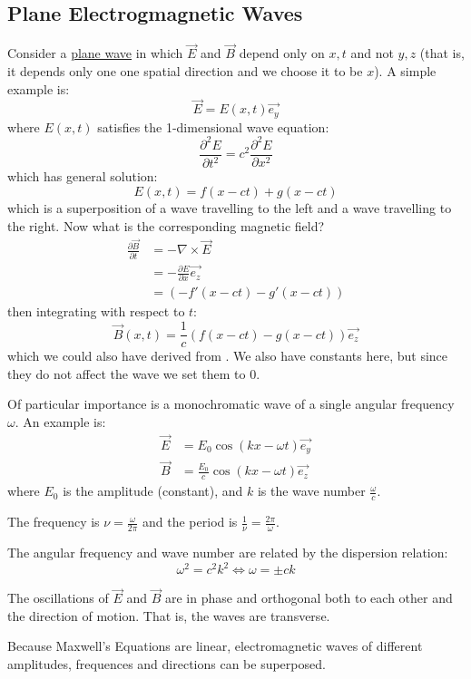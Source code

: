 \documentclass[../Main.tex]{subfiles}
\begin{document}
\subsection{Plane Electrogmagnetic Waves}
Consider a \underline{plane wave} in which $\vec{E}$ and $\vec{B}$ depend only on $x, t$ and not $y, z$ (that is, it depends only one one spatial direction and we choose it to be $x$). A simple example is:
\begin{equation*}
    \vec{E} = E(x, t) \vec{e_y}
\end{equation*}
where $E(x, t)$ satisfies the 1-dimensional wave equation:
\begin{equation*}
    \frac{\partial^{2}E}{\partial t^{2}} = c^2 \frac{\partial^{2}E}{\partial x^{2}}
\end{equation*}
which has general solution:
\begin{equation*}
    E(x, t) = f(x - ct) + g(x - ct)
\end{equation*}
which is a superposition of a wave travelling to the left and a wave travelling to the right. Now what is the corresponding magnetic field?
\begin{align*}
    \frac{\partial \vec{B}}{\partial t} &= - \nabla \times \vec{E} \\
    &= - \frac{\partial E}{\partial x} \vec{e_z} \\
    &= (-f'(x - ct) - g'(x - ct))
\end{align*}
then integrating with respect to $t$:
\begin{equation*}
    \vec{B}(x, t) = \frac1c\left(f(x - ct) - g(x - ct)\right) \vec{e_z}
\end{equation*}
which we could also have derived from . We also have constants here, but since they do not affect the wave we set them to 0.

Of particular importance is a monochromatic wave of a single angular frequency $\omega$. An example is:
\begin{align*}
    \vec{E} &= E_0 \cos(kx - \omega t) \vec{e_y} \\
    \vec{B} &= \frac{E_0}{c}\cos(kx - \omega t) \vec{e_z}
\end{align*}
where $E_0$ is the amplitude (constant), and $k$ is the wave number $\frac{\omega}{c}$.

\begin{remarks}
    \item The frequency is $\nu = \frac{\omega}{2\pi}$ and the period is $\frac1\nu = \frac{2\pi}{\omega}$.
    \item The angular frequency and wave number are related by the dispersion relation:
        \begin{equation*}
            \omega^2 = c^2 k^2 \iff \omega = \pm ck
        \end{equation*}
    \item The oscillations of $\vec{E}$ and $\vec{B}$ are in phase and orthogonal both to each other and the direction of motion. That is, the waves are transverse.
    \item Because Maxwell's Equations are linear, electromagnetic waves of different amplitudes, frequences and directions can be superposed.
\end{remarks}
\end{document}

